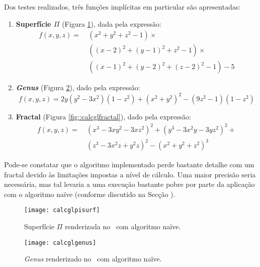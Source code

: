 Dos testes realizados, três funções implícitas em particular são apresentadas:

\begin{enumerate}
	\item \textbf{Superfície $\Pi$} (Figura \ref{fig::calcglpisurf}), dada pela expressão:
	\begin{align*}
		f(x,y,z) = ~& \left(x^2 + y^2 + z^2 - 1\right) \times \\
	                & \left((x-2)^2 + (y-1)^2 + z^2 - 1\right) \times \\
		            & \left((x-1)^2 + (y-2)^2 + (z-2)^2 - 1\right) - 5
	\end{align*}

	\item \textbf{\textit{Genus}} (Figura \ref{fig::calcglgenus}), dado pela expressão:
	\begin{equation*}
		f(x,y,z) = 2y(y^2 - 3x^2)(1-z^2) + (x^2 + y^2)^2 - (9z^2 - 1)(1 - z^2)
	\end{equation*}

	\item \textbf{Fractal} (Figura \ref{fig::calcglfractal}), dado pela expressão:
	\begin{align*}
		f(x,y,z) =~ & (x^3 - 3xy^2 - 3xz^2)^2 + (y^3 - 3x^2y - 3yz^2)^2 + \\
		            & (z^3 - 3x^2z + y^2z)^2  - (x^2 + y^2 + z^2)^3
	\end{align*}
\end{enumerate}

Pode-se constatar que o algoritmo implementado perde bastante detalhe com um fractal devido às limitações impostas a nível de cálculo. Uma maior precisão seria necessária, mas tal levaria a uma execução bastante pobre por parte da aplicação com o algoritmo naïve (conforme discutido na Secção ).

\begin{figure}[!htbp]
	\centering
	\texttt{[image: calcglpisurf]}
	\caption[Superfície $\Pi$ no \theapp~com algoritmo naïve]{Superfície $\Pi$ renderizada no \theapp~com algoritmo naïve.}
	\label{fig::calcglpisurf}
\end{figure}

\begin{figure}[!hbp]
	\centering
	\texttt{[image: calcglgenus]}
	\caption[\textit{Genus} no \theapp~com algoritmo naïve]{\textit{Genus} renderizado no \theapp~com algoritmo naïve.}
	\label{fig::calcglgenus}
\end{figure}

